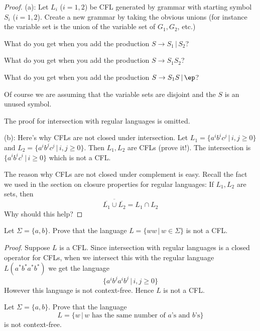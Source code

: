 \begin{proof}

(a): Let $L_i$ ($i=1,2$) be CFL generated by grammar with starting
symbol $S_i$ ($i=1,2$). Create a new grammar by taking the obvious
unions (for instance the variable set is the union of the variable
set of $G_1, G_2$, etc.)
\begin{mylist}
 \item What do you get when you add the production $S \rightarrow
 S_1 \,|\, S_2$?
 \item What do you get when you add the production $S \rightarrow
 S_1 S_2$?
 \item What do you get when you add the production $S \rightarrow
 S_1S \,|\, \ep$?
\end{mylist}
Of course we are assuming that the variable sets are disjoint and
the $S$ is an unused symbol.

The proof for intersection with regular languages is omitted.

(b): Here's why CFLs are not closed under intersection. Let $L_1 =
\{a^ib^ic^j \,|\, i,j \geq 0\}$ and $L_2 = \{a^ib^jc^j \,|\, i,j
\geq 0\}$. Then $L_1, L_2$ are CFLs (prove it!). The intersection
is $\{a^i b^i c^i \,|\, i \geq 0\}$ which is not a CFL.

The reason why CFLs are not closed under complement is easy.
Recall the fact we used in the section on closure properties for
regular languages: If $L_1, L_2$ are sets, then
\[
 \overline{ \overline{L_1} \cup \overline{L_2}} = L_1 \cap L_2
\]
Why should this help?
\end{proof}



\newpage
\begin{eg}
  Let $\Sigma = \{a,b\}$.
  Prove that the language $L = \{ww \,|\, w \in \Sigma \}$ is not a CFL.
\end{eg}

\textit{Proof}.
Suppose $L$ is a CFL. Since intersection with regular languages is a closed
operator for CFLs, when we intersect this with the
regular language $L(a^*b^*a^*b^*)$
we get the
language
\[
\{a^i b^j a^ib^j \,|\, i,j \geq 0 \}
\]
However this language is not context-free.
Hence $L$ is not a CFL.

\newpage
\begin{eg}
  Let $\Sigma = \{ a, b \}$.
  Prove that the language
  \[
  L = \{w \,|\, w \text{ has the same number of $a$'s and $b$'s} \}
  \]
  is not context-free.
\end{eg}
